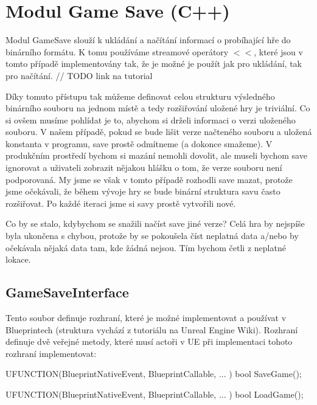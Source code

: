 
\section{Modul Game Save (C++)}

Modul GameSave slouží k ukládání a načítání informací o probíhající hře do binárního formátu. K tomu používáme streamové operátory $<<$, které jsou v tomto případě implementovány tak, že je možné je použít jak pro ukládání, tak pro načítání. // TODO link na tutorial

Díky tomuto přístupu tak můžeme definovat celou strukturu výsledného binárního souboru na jednom místě a tedy rozšiřování uložené hry je triviální. Co si ovšem musíme pohlídat je to, abychom si drželi informaci o verzi uloženého souboru. V našem případě, pokud se bude lišit verze načteného souboru a uložená konstanta v programu, save prostě odmítneme (a dokonce smažeme). V produkčním prostředí bychom si mazání nemohli dovolit, ale museli bychom save ignorovat a uživateli zobrazit nějakou hlášku o tom, že verze souboru není podporovaná. My jsme se však v tomto případě rozhodli save mazat, protože jsme očekávali, že během vývoje hry se bude binární struktura savu často rozšiřovat. Po každé iteraci jsme si savy prostě vytvořili nové.

Co by se stalo, kdybychom se snažili načíst save jiné verze? Celá hra by nejspíše byla ukončena s chybou, protože by se pokoušela číst neplatná data a/nebo by očekávala nějaká data tam, kde žádná nejsou. Tím bychom četli z neplatné lokace.




\subsection{GameSaveInterface}

Tento soubor definuje rozhraní, které je možné implementovat a používat v Blueprintech (struktura vychází z tutoriálu na Unreal Engine Wiki\citep{ue_interfaces_tut}). Rozhraní definuje dvě veřejné metody, které musí actoři v UE při implementaci tohoto rozhraní implementovat:

\begin{code}
UFUNCTION(BlueprintNativeEvent, BlueprintCallable, ... )
	bool SaveGame();

UFUNCTION(BlueprintNativeEvent, BlueprintCallable, ... )
	bool LoadGame();
\end{code}

